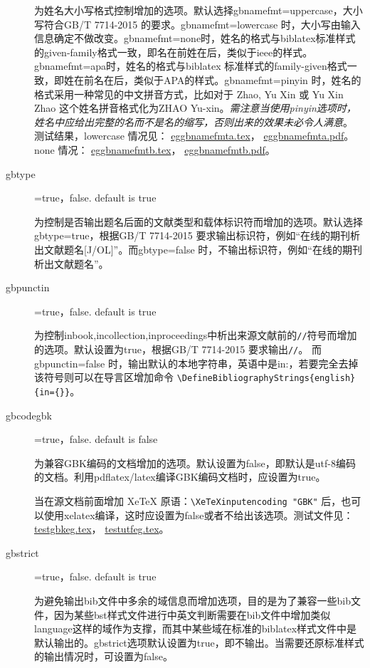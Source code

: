 \begin{description}
  为姓名大小写格式控制增加的选项。默认选择gbnamefmt=uppercase，大小写符合GB/T 7714-2015 的要求。gbnamefmt=lowercase 时，大小写由输入信息确定不做改变。gbnamefmt=none时，姓名的格式与biblatex标准样式的given-family格式一致，即名在前姓在后，类似于ieee的样式。gbnamefmt=apa时，姓名的格式与biblatex 标准样式的family-given格式一致，即姓在前名在后，类似于APA的样式。gbnamefmt=pinyin 时，姓名的格式采用一种常见的中文拼音方式，比如对于 Zhao, Yu Xin 或 Yu Xin Zhao 这个姓名拼音格式化为ZHAO Yu-xin。\emph{需注意当使用pinyin选项时，姓名中应给出完整的名而不是名的缩写，否则出来的效果未必令人满意}。
  测试结果，lowercase 情况见：
  \href{run:./example/eggbnamefmta.tex}{eggbnamefmta.tex}，
  \href{run:./example/eggbnamefmta.pdf}{eggbnamefmta.pdf}。
  none 情况：
  \href{run:./example/eggbnamefmtb.tex}{eggbnamefmtb.tex}，
  \href{run:./example/eggbnamefmtb.pdf}{eggbnamefmtb.pdf}。

  \item[gbtype]=true，false. \hfill default is true

  为控制是否输出题名后面的文献类型和载体标识符而增加的选项。默认选择gbtype=true，根据GB/T 7714-2015 要求输出标识符，例如“在线的期刊析出文献题名[J/OL]”。而gbtype=false 时，不输出标识符，例如“在线的期刊析出文献题名”。

  \item[gbpunctin]=true，false. \hfill default is true

  为控制inbook,incollection,inproceedings中析出来源文献前的\texttt{//}符号而增加的选项。默认设置为true，根据GB/T 7714-2015 要求输出\texttt{//}。 而gbpunctin=false 时，输出默认的本地字符串，英语中是in:，若要完全去掉该符号则可以在导言区增加命令
  \lstinline!\DefineBibliographyStrings{english}{in={}}!。

  \item[gbcodegbk]=true，false. \hfill default is false

  为兼容GBK编码的文档增加的选项。默认设置为false，即默认是utf-8编码的文档。利用pdflatex/latex编译GBK编码文档时，应设置为true。
  
  当在源文档前面增加 XeTeX 原语：\lstinline!\XeTeXinputencoding "GBK"! 后，也可以使用xelatex编译，这时应设置为false或者不给出该选项。测试文件见：
  \href{run:example/testgbkeg.tex}{testgbkeg.tex}，
  \href{run:example/testutfeg.tex}{testutfeg.tex}。

  \item[gbstrict]=true，false. \hfill default is true

  为避免输出bib文件中多余的域信息而增加选项，目的是为了兼容一些bib文件，因为某些bst样式文件进行中英文判断需要在bib文件中增加类似language这样的域作为支撑，而其中某些域在标准的biblatex样式文件中是默认输出的。gbstrict选项默认设置为true，即不输出。当需要还原标准样式的输出情况时，可设置为false。


\end{description}
